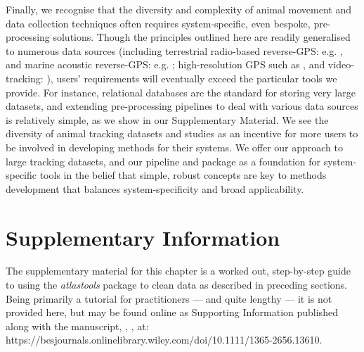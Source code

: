 Finally, we recognise that the diversity and complexity of animal movement and data collection techniques often requires system-specific, even bespoke, pre-processing solutions.
Though the principles outlined here are readily generalised to numerous data sources (including terrestrial radio-based reverse-GPS: e.g. \citealt{toledo2020}, and marine acoustic reverse-GPS: e.g. \citealt{aspillaga2021}; high-resolution GPS such as \citealt{strandburg-peshkin2015}, and video-tracking: \citealt{rathore2020}), users' requirements will eventually exceed the particular tools we provide.
For instance, relational databases are the standard for storing very large datasets, and extending pre-processing pipelines to deal with various data sources is relatively simple, as we show in our Supplementary Material.
We see the diversity of animal tracking datasets and studies as an incentive for more users to be involved in developing methods for their systems.
We offer our approach to large tracking datasets, and our pipeline and package as a foundation for system-specific tools in the belief that simple, robust concepts are key to methods development that balances system-specificity and broad applicability.

{ \begin{center}  \end{center} }



\begingroup

\let\clearpage\relax
\let\cleardoublepage\relax
\let\cleardoublepage\relax

{\chapter*{Supplementary Information}}

The supplementary material for this chapter is a worked out, step-by-step guide to using the \emph{atlastools} package to clean data as described in preceding sections.
Being primarily a tutorial for practitioners --- and quite lengthy --- it is not provided here, but may be found online as Supporting Information published along with the manuscript, \textcite{gupte2022d}, , at:
https://besjournals.onlinelibrary.wiley.com/doi/10.1111/1365-2656.13610.

{ \begin{center}  \end{center} }

\endgroup

